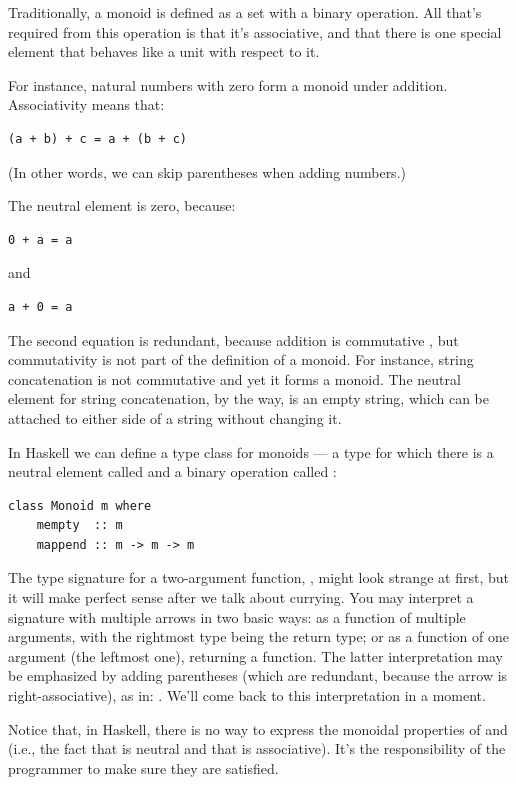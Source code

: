 Traditionally, a monoid is defined as a set with a binary operation. All
that's required from this operation is that it's associative, and that
there is one special element that behaves like a unit with respect to
it.

For instance, natural numbers with zero form a monoid under addition.
Associativity means that:

\begin{verbatim}
(a + b) + c = a + (b + c)
\end{verbatim}
(In other words, we can skip parentheses when adding numbers.)

The neutral element is zero, because:

\begin{verbatim}
0 + a = a
\end{verbatim}
and

\begin{verbatim}
a + 0 = a
\end{verbatim}
The second equation is redundant, because addition is commutative , but commutativity is not part of the definition of a monoid.
For instance, string concatenation is not commutative and yet it forms a
monoid. The neutral element for string concatenation, by the way, is an
empty string, which can be attached to either side of a string without
changing it.

In Haskell we can define a type class for monoids --- a type for which
there is a neutral element called  and a binary operation
called :

\begin{verbatim}
class Monoid m where
    mempty  :: m
    mappend :: m -> m -> m
\end{verbatim}
The type signature for a two-argument function,
, might look strange at first,
but it will make perfect sense after we talk about currying. You may
interpret a signature with multiple arrows in two basic ways: as a
function of multiple arguments, with the rightmost type being the return
type; or as a function of one argument (the leftmost one), returning a
function. The latter interpretation may be emphasized by adding
parentheses (which are redundant, because the arrow is
right-associative), as in: .
We'll come back to this interpretation in a moment.

Notice that, in Haskell, there is no way to express the monoidal
properties of  and  (i.e., the fact that
 is neutral and that  is associative).
It's the responsibility of the programmer to make sure they are
satisfied.

